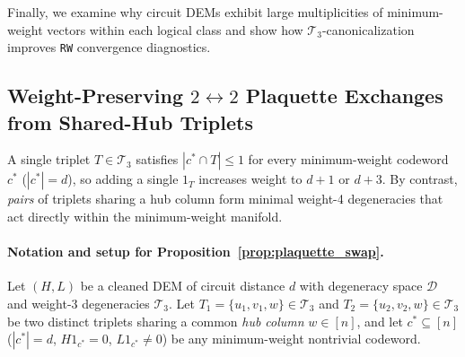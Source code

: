 \documentclass[12pt]{article}
\theoremstyle{definition}
\newcommand{\Dc}{\mathcal{D}}
\newcommand{\Tc}{\mathcal{T}_3}
\newcommand{\ttt}[1]{\texttt{#1}}
\begin{document}
Finally, we examine why circuit DEMs exhibit large multiplicities of minimum-weight vectors within each logical
class and show how $\Tc$-canonicalization improves \ttt{RW} convergence diagnostics.

\subsection{Weight-Preserving \texorpdfstring{$2 \leftrightarrow 2$}{2<->2} Plaquette Exchanges from Shared-Hub
  Triplets}\label{subsec:plaquette}

A single triplet $T \in \Tc$ satisfies $|c^* \cap T| \le 1$ for every minimum-weight codeword $c^*$ ($|c^*| = d$),
so adding a single $1_T$ increases weight to $d + 1$ or $d + 3$. By contrast, \emph{pairs} of triplets sharing a
hub column form minimal weight-4 degeneracies that act directly within the minimum-weight manifold.

\paragraph{Notation and setup for Proposition~\ref{prop:plaquette_swap}.}
Let $(H, L)$ be a cleaned DEM of circuit distance $d$ with degeneracy space $\Dc$ and weight-3 degeneracies $\Tc$.
Let $T_1 = \{u_1, v_1, w\} \in \Tc$ and $T_2 = \{u_2, v_2, w\} \in \Tc$ be two distinct triplets sharing a common
\emph{hub column} $w \in [n]$, and let $c^* \subseteq [n]$ ($|c^*| = d$, $H 1_{c^*} = 0$, $L 1_{c^*} \neq 0$) be
any minimum-weight nontrivial codeword.
\end{document}
